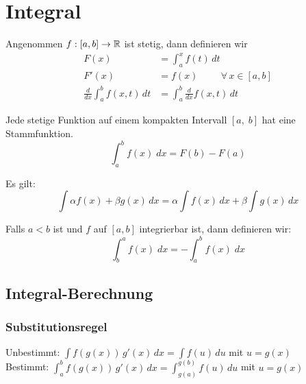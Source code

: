\section{Integral}
\begin{theorem} Angenommen $f:[a, b] \to \mathbb{R}$ ist stetig, dann definieren wir
\begin{align*}
	F(x) &= \int_a^x f(t) \, dt \\
	F'(x) &= f(x) \hspace{1cm} \forall \, x \in [a, b]\\
	\frac{d}{dx} \int_a^b f(x, t) \, dt &= \int_a^b \frac{d}{dx} f(x,t) \, dt
\end{align*}
\end{theorem}

\begin{corollary}[Stammfunktion] Jede stetige Funktion auf einem kompakten Intervall $[a,\; b]$ hat eine Stammfunktion.
\[
	\int_a^b f(x) \; dx = F(b) - F(a)
\]
\end{corollary}

\begin{corollary}[Linearität] Es gilt:
\[
	\int \alpha f(x) + \beta g(x)\,dx = \alpha \int f(x)\,dx + \beta \int g(x)\,dx
\]
\end{corollary}

\begin{definition}Falls $a < b$ ist und $f$ auf $[a, b]$ integrierbar ist, dann definieren wir:
\[
	\int_b^a f(x) \; dx = - \int_a^b f(x) \; dx
\]
\end{definition}

\vfill
\pagebreak

\subsection{Integral-Berechnung}
\subsubsection{Substitutionsregel}
Unbestimmt: $\int f(g(x)) \, g'(x) \, dx = \int f(u) \, du$ mit $u = g(x)$\\
Bestimmt: $\int_a^b f(g(x)) \, g'(x) \, dx = \int_{g(a)}^{g(b)} f(u) \, du$ mit $u = g(x)$

